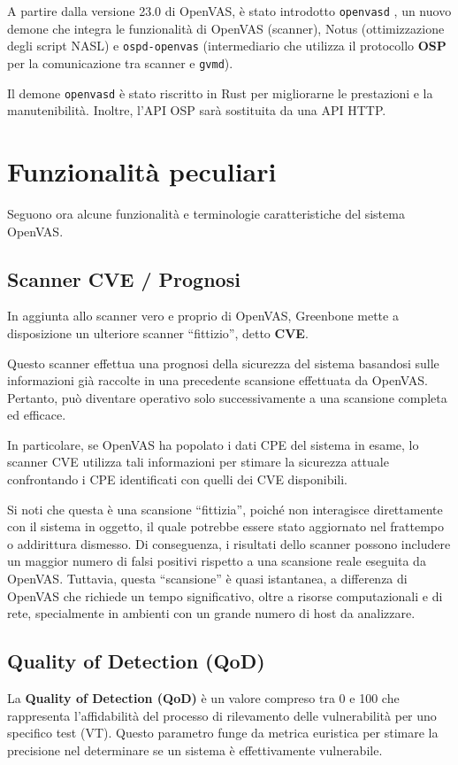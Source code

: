 \label{openvasd}
A partire dalla versione 23.0 di OpenVAS, è stato introdotto \texttt{openvasd} \cite{openvas-scanner}, un nuovo demone che integra le funzionalità di OpenVAS (scanner), Notus (ottimizzazione degli script NASL) e \texttt{ospd-openvas} (intermediario che utilizza il protocollo \textbf{OSP} per la comunicazione tra scanner e \texttt{gvmd}).

Il demone \texttt{openvasd} è stato riscritto in Rust per migliorarne le prestazioni e la manutenibilità. Inoltre, l'API OSP sarà sostituita da una API HTTP.

\section{Funzionalità peculiari}
Seguono ora alcune funzionalità e terminologie caratteristiche del sistema OpenVAS.

\subsection{Scanner CVE / Prognosi}
\label{cve}
In aggiunta allo scanner vero e proprio di OpenVAS, Greenbone mette a disposizione un ulteriore scanner ``fittizio'', detto \textbf{CVE}.

Questo scanner effettua una prognosi della sicurezza del sistema basandosi sulle informazioni già raccolte in una precedente scansione effettuata da OpenVAS. Pertanto, può diventare operativo solo successivamente a una scansione completa ed efficace.

In particolare, se OpenVAS ha popolato i dati CPE del sistema in esame, lo scanner CVE utilizza tali informazioni per stimare la sicurezza attuale confrontando i CPE identificati con quelli dei CVE disponibili.

Si noti che questa è una scansione ``fittizia'', poiché non interagisce direttamente con il sistema in oggetto, il quale potrebbe essere stato aggiornato nel frattempo o addirittura dismesso. Di conseguenza, i risultati dello scanner possono includere un maggior numero di falsi positivi rispetto a una scansione reale eseguita da OpenVAS. Tuttavia, questa ``scansione'' è quasi istantanea, a differenza di OpenVAS che richiede un tempo significativo, oltre a risorse computazionali e di rete, specialmente in ambienti con un grande numero di host da analizzare.

\subsection{Quality of Detection (QoD)}
\label{qod}
La \textbf{Quality of Detection (QoD)} è un valore compreso tra 0 e 100 che rappresenta l'affidabilità del processo di rilevamento delle vulnerabilità per uno specifico test (VT). Questo parametro funge da metrica euristica per stimare la precisione nel determinare se un sistema è effettivamente vulnerabile.

